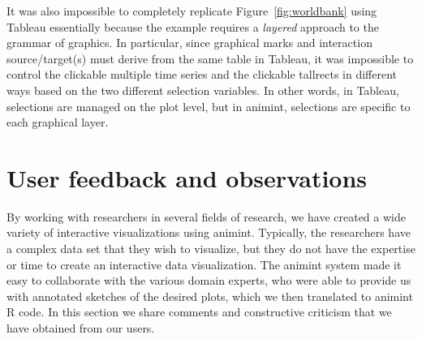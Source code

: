 \documentclass[journal]{vgtc}\usepackage[]{graphicx}\usepackage[]{color}
\begin{document}
%
%



It was also impossible to completely replicate Figure~\ref{fig:worldbank}
using Tableau essentially because the example requires a \emph{layered} 
approach to the grammar of graphics. In particular, since graphical
marks and interaction source/target(s) must derive from the same table
in Tableau, it was impossible to control the clickable multiple time 
series and the clickable tallrects in different ways based on the two 
different selection variables. In other words, in Tableau, selections 
are managed on the plot level, but in animint, selections are specific
to each graphical layer.

\section{User feedback and observations}

By working with researchers in several fields of research,
we have created a wide variety of
interactive visualizations using animint.
Typically, the researchers have a complex data set that
they wish to visualize,
but they do not have the expertise or time to create
an interactive data visualization.
The animint system made it easy to collaborate with the various domain experts,
who were able to provide us with annotated sketches of the desired plots,
which we then translated to animint R code.
In this section we share comments and
constructive criticism that we have obtained from our users.
\end{document}
